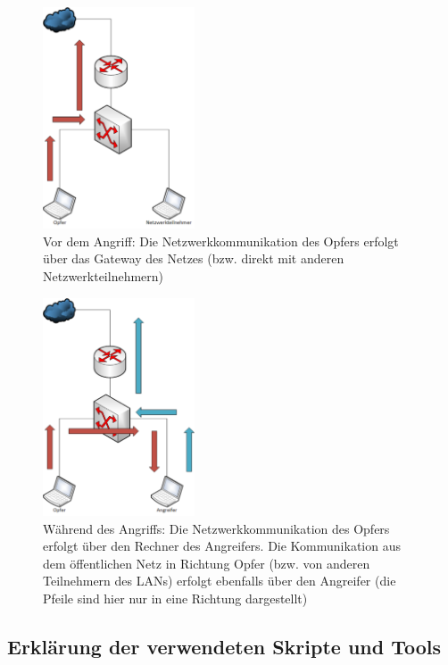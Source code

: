 \begin{figure}[h!]
	\centering
		\includegraphics[width=0.40\textwidth]{bilder/arpSpoofing/arp_soofing_before.pdf}
	\caption{Vor dem Angriff: Die Netzwerkkommunikation des Opfers erfolgt über das Gateway des Netzes (bzw. direkt mit anderen Netzwerkteilnehmern)}
	\label{fig:arp_soofing_before}
\end{figure}

\begin{figure}[h!]
	\centering
		\includegraphics[width=0.40\textwidth]{bilder/arpSpoofing/arp_soofing_after.pdf}
	\caption{Während des Angriffs: Die Netzwerkkommunikation des Opfers erfolgt über den Rechner des Angreifers. Die Kommunikation aus dem öffentlichen Netz in Richtung Opfer (bzw. von anderen Teilnehmern des LANs) erfolgt ebenfalls über den Angreifer (die Pfeile sind hier nur in eine Richtung dargestellt)}
	\label{fig:arp_soofing_after}
\end{figure}


\subsection*{Erklärung der verwendeten Skripte und Tools}

